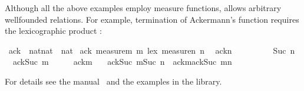\begin{isabellebody}
\begin{isamarkuptext}
Although all the above examples employ measure functions, 
allows arbitrary wellfounded relations. For example, termination of
Ackermann's function requires the lexicographic product :%
\end{isamarkuptext}%
\ ack\ {\isacharcolon}{\isacharcolon}\ {\isachardoublequote}nat{\isasymtimes}nat\ {\isasymRightarrow}\ nat{\isachardoublequote}\isanewline
{}\ ack\ {\isachardoublequote}measure{\isacharparenleft}{\isasymlambda}m{\isachardot}\ m{\isacharparenright}\ {\isacharless}{\isacharasterisk}lex{\isacharasterisk}{\isachargreater}\ measure{\isacharparenleft}{\isasymlambda}n{\isachardot}\ n{\isacharparenright}{\isachardoublequote}\isanewline
\ \ {\isachardoublequote}ack{\isacharparenleft}n{\isacharparenright}\ \ \ \ \ \ \ \ \ {\isacharequal}\ Suc\ n{\isachardoublequote}\isanewline
\ \ {\isachardoublequote}ack{\isacharparenleft}Suc\ m{\isacharcomma}\ \ \ \ \ {\isacharequal}\ ack{\isacharparenleft}m{\isacharcomma}\ \isanewline
\ \ {\isachardoublequote}ack{\isacharparenleft}Suc\ m{\isacharcomma}Suc\ n{\isacharparenright}\ {\isacharequal}\ ack{\isacharparenleft}m{\isacharcomma}ack{\isacharparenleft}Suc\ m{\isacharcomma}n{\isacharparenright}{\isacharparenright}{\isachardoublequote}%
\begin{isamarkuptext}%
\noindent
For details see the manual~\cite{isabelle-HOL} and the examples in the
library.%
\end{isamarkuptext}%
\end{isabellebody}%
